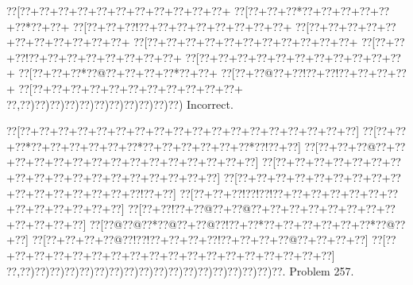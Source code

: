 \documentclass[a5paper]{article}
\begin{document}
\begin{center}
{\goo
\0??[\0??+\0??+\0??+\0??+\0??+\0??+\0??+\0??+\0??+\0??+\0??+
\0??[\0??+\0??+\0??*\0??+\0??+\0??+\0??+\0??+\0??*\0??+\0??+
\0??[\0??+\0??+\0??!\0??+\0??+\0??+\0??+\0??+\0??+\0??+\0??+
\0??[\0??+\0??+\0??+\0??+\0??+\0??+\0??+\0??+\0??+\0??+\0??+
\0??[\0??+\0??+\0??+\0??+\0??+\0??+\0??+\0??+\0??+\0??+\0??+
\0??[\0??+\0??+\0??!\0??+\0??+\0??+\0??+\0??+\0??+\0??+\0??+
\0??[\0??+\0??+\0??+\0??+\0??+\0??+\0??+\0??+\0??+\0??+\0??+
\0??[\0??+\0??+\0??*\0??@\0??+\0??+\0??+\0??*\0??+\0??+
\0??[\0??+\0??@\0??+\0??!\0??+\0??!\0??+\0??+\0??+\0??+
\0??[\0??+\0??+\0??+\0??+\0??+\0??+\0??+\0??+\0??+\0??+\0??+
\0??,\0??)\0??)\0??)\0??)\0??)\0??)\0??)\0??)\0??)\0??)\0??)
}
Incorrect. 

\end{center}
\newpage
\begin{center}
{\goo
\0??[\0??+\0??+\0??+\0??+\0??+\0??+\0??+\0??+\0??+\0??+\0??+\0??+\0??+\0??+\0??+\0??+\0??+\0??]
\0??[\0??+\0??+\0??*\0??+\0??+\0??+\0??+\0??+\0??*\0??+\0??+\0??+\0??+\0??+\0??*\0??!\0??+\0??]
\0??[\0??+\0??+\0??@\0??+\0??+\0??+\0??+\0??+\0??+\0??+\0??+\0??+\0??+\0??+\0??+\0??+\0??+\0??]
\0??[\0??+\0??+\0??+\0??+\0??+\0??+\0??+\0??+\0??+\0??+\0??+\0??+\0??+\0??+\0??+\0??+\0??+\0??]
\0??[\0??+\0??+\0??+\0??+\0??+\0??+\0??+\0??+\0??+\0??+\0??+\0??+\0??+\0??+\0??+\0??!\0??+\0??]
\0??[\0??+\0??+\0??!\0??!\0??!\0??+\0??+\0??+\0??+\0??+\0??+\0??+\0??+\0??+\0??+\0??+\0??+\0??]
\0??[\0??+\0??!\0??+\0??@\0??+\0??@\0??+\0??+\0??+\0??+\0??+\0??+\0??+\0??+\0??+\0??+\0??+\0??]
\0??[\0??@\0??@\0??*\0??@\0??+\0??@\0??!\0??+\0??*\0??+\0??+\0??+\0??+\0??+\0??*\0??@\0??+\0??]
\0??[\0??+\0??+\0??+\0??@\0??!\0??!\0??+\0??+\0??+\0??!\0??+\0??+\0??+\0??@\0??+\0??+\0??+\0??]
\0??[\0??+\0??+\0??+\0??+\0??+\0??+\0??+\0??+\0??+\0??+\0??+\0??+\0??+\0??+\0??+\0??+\0??+\0??]
\0??,\0??)\0??)\0??)\0??)\0??)\0??)\0??)\0??)\0??)\0??)\0??)\0??)\0??)\0??)\0??)\0??)\0??)\0??.
}
Problem 257.

\end{center}
\end{document}

